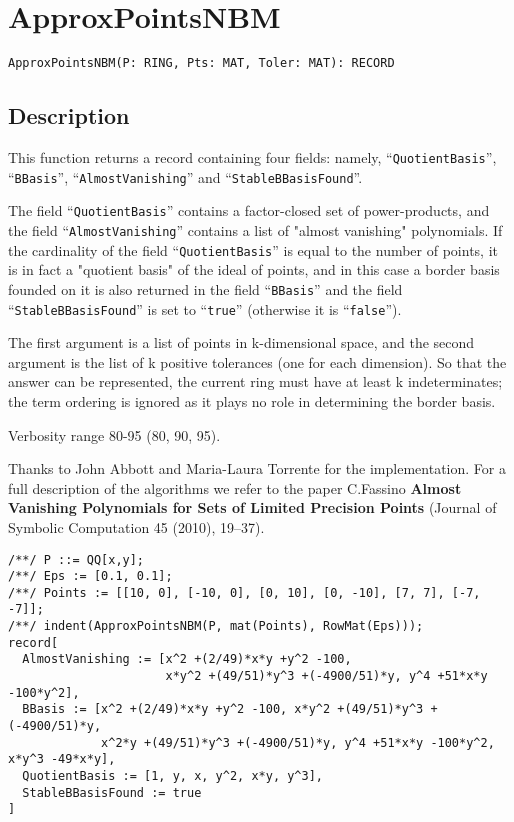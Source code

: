 \documentclass[a4paper]{mybook}
\newenvironment{command}{}{} %
\begin{document}
\section{ApproxPointsNBM}
\label{ApproxPointsNBM}
\begin{command} %


\begin{Verbatim}[label=syntax, rulecolor=\color{MidnightBlue},
frame=single]
ApproxPointsNBM(P: RING, Pts: MAT, Toler: MAT): RECORD
\end{Verbatim}


\subsection*{Description}

This function returns a record containing four fields: namely,
``\verb&QuotientBasis&'', ``\verb&BBasis&'', ``\verb&AlmostVanishing&'' and ``\verb&StableBBasisFound&''.
\par 
The field ``\verb&QuotientBasis&'' contains a factor-closed set of
power-products, and the field ``\verb&AlmostVanishing&'' contains a list
of "almost vanishing" polynomials.  If the cardinality of the field
``\verb&QuotientBasis&'' is equal to the number of points, it is in fact a
"quotient basis" of the ideal of points, and in this case a
border basis founded on it is also returned in the field ``\verb&BBasis&''
and the field ``\verb&StableBBasisFound&'' is set to ``\verb&true&'' (otherwise
it is ``\verb&false&'').
\par 
The first argument is a list of points in k-dimensional space, and the
second argument is the list of k positive tolerances (one for each
dimension).  So that the answer can be represented, the current ring
must have at least k indeterminates; the term ordering is ignored as
it plays no role in determining the border basis.
\par 
Verbosity range 80-95 (80, 90, 95).
\par 
Thanks to John Abbott and Maria-Laura Torrente for the implementation.
For a full description of the algorithms we refer to the paper C.Fassino
\textbf{Almost Vanishing Polynomials for Sets of Limited Precision Points}
 (Journal of Symbolic Computation 45 (2010), 19--37).
\begin{Verbatim}[label=example, rulecolor=\color{PineGreen}, frame=single]
/**/ P ::= QQ[x,y];
/**/ Eps := [0.1, 0.1];
/**/ Points := [[10, 0], [-10, 0], [0, 10], [0, -10], [7, 7], [-7, -7]];
/**/ indent(ApproxPointsNBM(P, mat(Points), RowMat(Eps)));
record[
  AlmostVanishing := [x^2 +(2/49)*x*y +y^2 -100,
                      x*y^2 +(49/51)*y^3 +(-4900/51)*y, y^4 +51*x*y -100*y^2],
  BBasis := [x^2 +(2/49)*x*y +y^2 -100, x*y^2 +(49/51)*y^3 +(-4900/51)*y,
             x^2*y +(49/51)*y^3 +(-4900/51)*y, y^4 +51*x*y -100*y^2, x*y^3 -49*x*y],
  QuotientBasis := [1, y, x, y^2, x*y, y^3],
  StableBBasisFound := true
]
\end{Verbatim}



\end{command}
\end{document}
